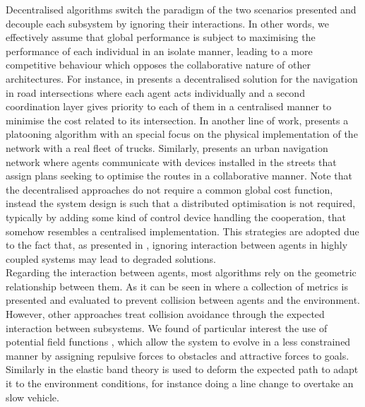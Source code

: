 \documentclass[a4paper,fleqn]{cas-sc}
\begin{document}
Decentralised algorithms switch the paradigm of the two scenarios presented and decouple each subsystem by ignoring their interactions. In other words, we effectively assume that global performance is subject to maximising the performance of each individual in an isolate manner, leading to a more competitive behaviour which opposes the collaborative nature of other architectures. For instance, in \cite{Hult2019} presents a decentralised solution for the navigation in road intersections where each agent acts individually and a second coordination layer gives priority to each of them in a centralised manner to minimise the cost related to its intersection. In another line of work, \cite{Lee2020} presents a platooning algorithm with an special focus on the physical implementation of the network with a real fleet of trucks. Similarly, \cite{Regragui2023} presents an urban navigation network where agents communicate with devices installed in the streets that assign plans seeking to optimise the routes in a collaborative manner. Note that the decentralised approaches do not require a common global cost function, instead the system design is such that a distributed optimisation is not required, typically by adding some kind of control device handling the cooperation, that somehow resembles a centralised implementation. This strategies are adopted due to the fact that, as presented in \cite{guillaume2008fast}, ignoring interaction between agents  in highly coupled systems may lead to degraded solutions. \\

Regarding the interaction between agents, most algorithms rely on the geometric relationship between them. As it can be seen in \cite{Frenet2022} where a collection of metrics is presented and evaluated to prevent collision between agents and the environment. However, other approaches treat collision avoidance through the expected interaction between subsystems. We found of particular interest the use of potential field functions \cite{Rasekhipour2017}, which allow the system to evolve in a less constrained manner by assigning repulsive forces to obstacles and attractive forces to goals. Similarly in \cite{Song2013} the elastic band theory is used to deform the expected path to adapt it to the environment conditions, for instance doing a line change to overtake an slow vehicle.\\
\end{document}
